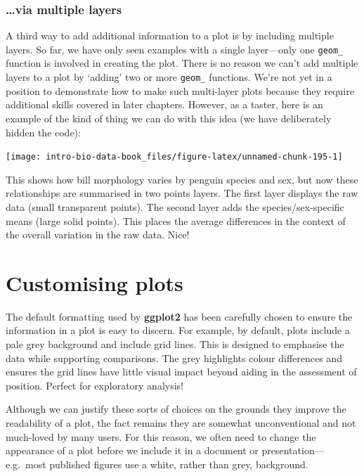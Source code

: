 \documentclass[
]{book}
\begin{document}
\hypertarget{via-multiple-layers}{%
\subsection{\ldots via multiple layers}\label{via-multiple-layers}}

A third way to add additional information to a plot is by including multiple layers. So far, we have only seen examples with a single layer---only one \texttt{geom\_} function is involved in creating the plot. There is no reason we can't add multiple layers to a plot by `adding' two or more \texttt{geom\_} functions. We're not yet in a position to demonstrate how to make such multi-layer plots because they require additional skills covered in later chapters. However, as a taster, here is an example of the kind of thing we can do with this idea (we have deliberately hidden the code):

\begin{center}\texttt{[image: intro-bio-data-book\_files/figure-latex/unnamed-chunk-195-1]} \end{center}

This shows how bill morphology varies by penguin species and sex, but now these relationships are summarised in two points layers. The first layer displays the raw data (small transparent points). The second layer adds the species/sex-specific means (large solid points). This places the average differences in the context of the overall variation in the raw data. Nice!

\hypertarget{chapter-customise-ggplot2}{%
\chapter{Customising plots}\label{chapter-customise-ggplot2}}

The default formatting used by \textbf{ggplot2} has been carefully chosen to ensure the information in a plot is easy to discern. For example, by default, plots include a pale grey background and include grid lines. This is designed to emphasise the data while supporting comparisons. The grey highlights colour differences and ensures the grid lines have little visual impact beyond aiding in the assessment of position. Perfect for exploratory analysis!

Although we can justify these sorts of choices on the grounds they improve the readability of a plot, the fact remains they are somewhat unconventional and not much-loved by many users. For this reason, we often need to change the appearance of a plot before we include it in a document or presentation---e.g.~most published figures use a white, rather than grey, background.
\end{document}
